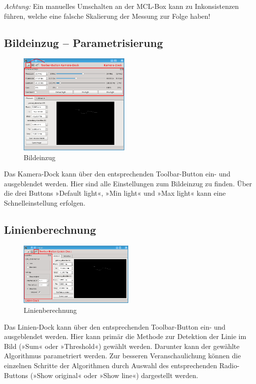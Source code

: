 \documentclass[a4paper,10pt]{scrartcl}
\begin{document}
\textsl{Achtung:} Ein manuelles Umschalten an der MCL-Box kann zu Inkonsistenzen führen, welche eine
falsche Skalierung der Messung zur Folge haben!

\newpage
\subsection{Bildeinzug – Parametrisierung}

\begin{figure}[H]
  \centering
  \includegraphics[width=0.48\textwidth]{include/cam.png}
  \caption{Bildeinzug}
  \label{fig:Bildeinzug}
\end{figure}

Das Kamera-Dock kann über den entsprechenden Toolbar-Button ein- und ausgeblendet werden.
Hier sind alle Einstellungen zum Bildeinzug zu finden. Über die drei Buttons »Default light«,
»Min light« und  »Max light« kann eine Schnelleinstellung erfolgen.

\subsection{Linienberechnung}

\begin{figure}[H]
  \centering
  \includegraphics[width=0.5\textwidth]{include/laser.png}
  \caption{Linienberechnung}
  \label{fig:Linienberechnung}
\end{figure}

Das Linien-Dock kann über den entsprechenden Toolbar-Button ein- und ausgeblendet werden.
Hier kann primär die Methode zur Detektion der Linie im Bild (»Sum« oder »Threshold«) gewählt
werden. Darunter kann der gewählte Algorithmus parametriert werden. Zur besseren Veranschaulichung
können die einzelnen Schritte der Algorithmen durch Auswahl des entsprechenden Radio-Buttons
(»Show original« oder »Show line«) dargestellt werden.
\end{document}
